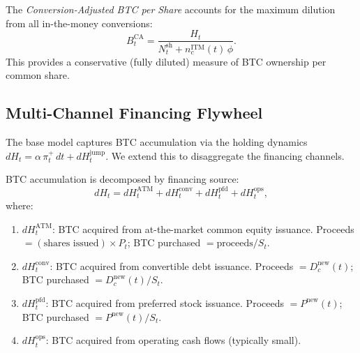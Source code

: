 \begin{definition}\label{def:ca_bps}
The \emph{Conversion-Adjusted BTC per Share} accounts for the maximum
dilution from all in-the-money conversions:
\begin{equation}\label{eq:ca_bps}
  B_t^{\mathrm{CA}}
  = \frac{H_t}{N_t^{\mathrm{sh}} + n_c^{\mathrm{ITM}}(t)\,\phi}.
\end{equation}
This provides a conservative (fully diluted) measure of BTC ownership per
common share.
\end{definition}

\subsection{Multi-Channel Financing Flywheel}\label{subsec:flywheel}

The base model captures BTC accumulation via the holding dynamics
$dH_t = \alpha\,\pi_t^+\,dt + dH_t^{\mathrm{jump}}$.
We extend this to disaggregate the financing channels.

\begin{definition}\label{def:multichannel}
BTC accumulation is decomposed by financing source:
\begin{equation}\label{eq:dH_multi}
  dH_t = dH_t^{\mathrm{ATM}} + dH_t^{\mathrm{conv}} + dH_t^{\mathrm{pfd}}
         + dH_t^{\mathrm{ops}},
\end{equation}
where:
\begin{enumerate}
  \item $dH_t^{\mathrm{ATM}}$: BTC acquired from at-the-market common equity
        issuance.  Proceeds $= (\text{shares issued}) \times P_t$; BTC
        purchased $= \text{proceeds} / S_t$.
  \item $dH_t^{\mathrm{conv}}$: BTC acquired from convertible debt issuance.
        Proceeds $= D_c^{\mathrm{new}}(t)$; BTC purchased
        $= D_c^{\mathrm{new}}(t) / S_t$.
  \item $dH_t^{\mathrm{pfd}}$: BTC acquired from preferred stock issuance.
        Proceeds $= P^{\mathrm{new}}(t)$; BTC purchased
        $= P^{\mathrm{new}}(t) / S_t$.
  \item $dH_t^{\mathrm{ops}}$: BTC acquired from operating cash flows
        (typically small).
\end{enumerate}
\end{definition}

